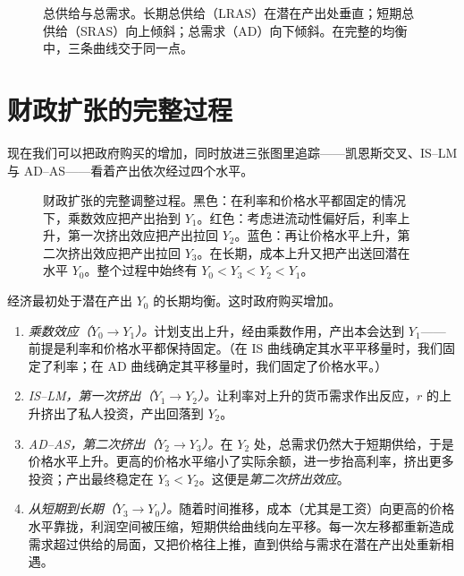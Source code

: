 \begin{figure}[h]
\centering

\caption{总供给与总需求。长期总供给（LRAS）在潜在产出处垂直；短期总供给（SRAS）向上倾斜；总需求（AD）向下倾斜。在完整的均衡中，三条曲线交于同一点。}
\label{fig:macro-26}
\end{figure}


\section{财政扩张的完整过程}

现在我们可以把政府购买的增加，同时放进三张图里追踪——凯恩斯交叉、IS--LM 与 AD--AS——看着产出依次经过四个水平。

\begin{figure}[h]
\centering

\caption{财政扩张的完整调整过程。黑色：在利率和价格水平都固定的情况下，乘数效应把产出抬到 $Y_1$。红色：考虑进流动性偏好后，利率上升，第一次挤出效应把产出拉回 $Y_2$。蓝色：再让价格水平上升，第二次挤出效应把产出拉回 $Y_3$。在长期，成本上升又把产出送回潜在水平 $Y_0$。整个过程中始终有 $Y_0<Y_3<Y_2<Y_1$。}
\label{fig:macro-27}
\end{figure}

经济最初处于潜在产出 $Y_0$ 的长期均衡。这时政府购买增加。
\begin{enumerate}
\item \emph{乘数效应（$Y_0\to Y_1$）。}计划支出上升，经由乘数作用，产出本会达到 $Y_1$——前提是利率和价格水平都保持固定。（在 IS 曲线确定其水平平移量时，我们固定了利率；在 AD 曲线确定其平移量时，我们固定了价格水平。）
\item \emph{IS--LM，第一次挤出（$Y_1\to Y_2$）。}让利率对上升的货币需求作出反应，$r$ 的上升挤出了私人投资，产出回落到 $Y_2$。
\item \emph{AD--AS，第二次挤出（$Y_2\to Y_3$）。}在 $Y_2$ 处，总需求仍然大于短期供给，于是价格水平上升。更高的价格水平缩小了实际余额，进一步抬高利率，挤出更多投资；产出最终稳定在 $Y_3<Y_2$。这便是\emph{第二次挤出效应}。
\item \emph{从短期到长期（$Y_3\to Y_0$）。}随着时间推移，成本（尤其是工资）向更高的价格水平靠拢，利润空间被压缩，短期供给曲线向左平移。每一次左移都重新造成需求超过供给的局面，又把价格往上推，直到供给与需求在潜在产出处重新相遇。
\end{enumerate}


